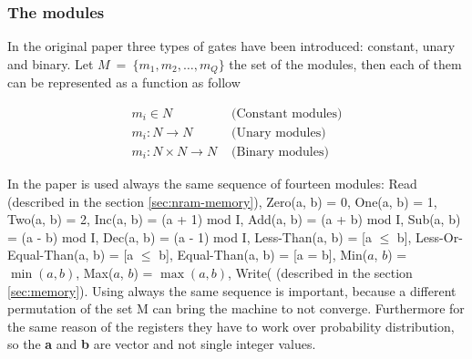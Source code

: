 \subsubsection*{The modules}
In the original paper three types of gates have been introduced: constant, unary and binary. Let $M\ =\ \{m_1, m_2, \dots, m_Q \}$ the set of the modules, then each of them can be represented as a function as follow
\begin{center}
	\begin{equation}
		\begin{split}		
			m_i \in N & \textrm{ (Constant modules)} \\
			m_i: N \rightarrow N & \textrm{ (Unary modules)} \\
			m_i: N \times N \rightarrow N & \textrm{ (Binary modules)}
		\end{split}
	\end{equation}
\end{center}
In the paper is used always the same sequence of fourteen modules: Read (described in the section \ref{sec:nram-memory}), Zero(a, b) = 0, One(a, b) = 1, Two(a, b) = 2, Inc(a, b) = (a + 1) mod I, Add(a, b) = (a + b) mod I, Sub(a, b) = (a - b) mod I, Dec(a, b) = (a - 1) mod I, Less-Than(a, b) = [a $\le$ b], Less-Or-Equal-Than(a, b) = [a $\leq$ b], Equal-Than(a, b) = [a = b], Min($a$, $b$) = $\min(a, b)$, Max($a$, $b$) = $\max(a, b)$, Write( (described in the section \ref{sec:memory}). Using always the same sequence is important, because a different permutation of the set M can bring the machine to not converge. Furthermore for the same reason of the registers they have to work over probability distribution, so the \textbf{a} and \textbf{b} are vector and not single integer values.

